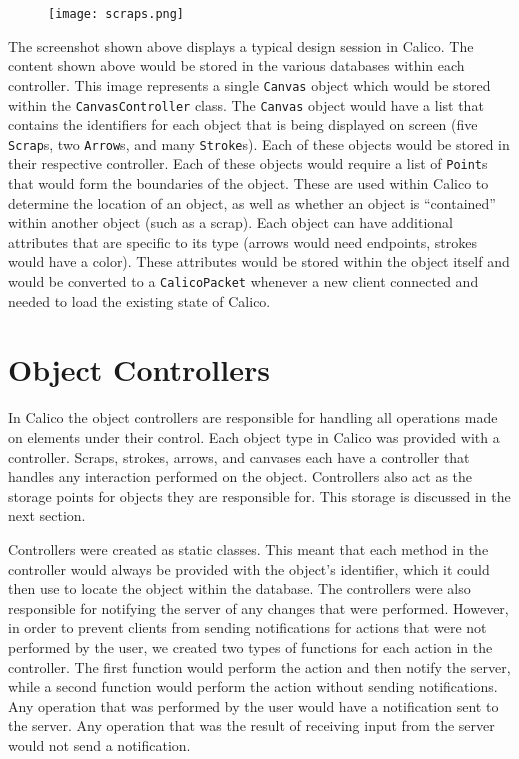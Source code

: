 \begin{figure}[htb]
  \centering
  \texttt{[image: scraps.png]}
  \label{fig:scraps_storage}
\end{figure}

The screenshot shown above displays a typical design session in Calico. The content shown above would be stored in the various databases within each controller. This image represents a single \texttt{Canvas} object which would be stored within the \texttt{CanvasController} class. The \texttt{Canvas} object would have a list that contains the identifiers for each object that is being displayed on screen (five \texttt{Scrap}s, two \texttt{Arrow}s, and many \texttt{Stroke}s). Each of these objects would be stored in their respective controller. Each of these objects would require a list of \texttt{Point}s that would form the boundaries of the object. These are used within Calico to determine the location of an object, as well as whether an object is ``contained'' within another object (such as a scrap). Each object can have additional attributes that are specific to its type (arrows would need endpoints, strokes would have a color). These attributes would be stored within the object itself and would be converted to a \texttt{CalicoPacket} whenever a new client connected and needed to load the existing state of Calico.


\section{Object Controllers}
In Calico the object controllers are responsible for handling all operations made on elements under their control. Each object type in Calico was provided with a controller.
Scraps, strokes, arrows, and canvases each have a controller that handles any interaction performed on the object. 
Controllers also act as the storage points for objects they are responsible for. This storage is discussed in the next section.

Controllers were created as static classes. This meant that each method in the controller would always be provided with the object's identifier, which it could then use to locate the object within the database. 
The controllers were also responsible for notifying the server of any changes that were performed. However, in order to prevent clients from sending notifications for actions that were not performed by the user, we created two types of functions for each action in the controller. The first function would perform the action and then notify the server, while a second function would perform the action without sending notifications. Any operation that was performed by the user would have a notification sent to the server. Any operation that was the result of receiving input from the server would not send a notification.

